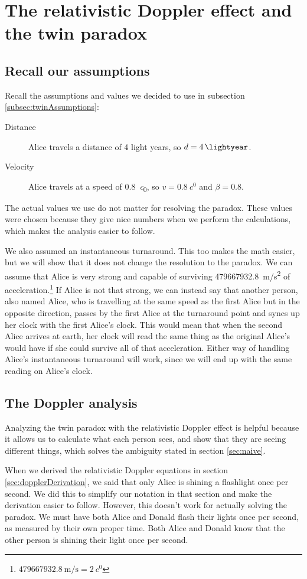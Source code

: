 \section{The relativistic Doppler effect and the twin paradox}\label{sec:dopplerAnalysis}
	\subsection{Recall our assumptions}
		Recall the assumptions and values we decided to use in subsection \ref{subsec:twinAssumptions}:
		\begin{description}
			\item[Distance] Alice travels a distance of 4 light years, so $d = \SI{4}{\lightyear}$.
			\item[Velocity] Alice travels at a speed of \SI{0.8}{\clight}, so $v = \SI{0.8}{\clight}$ and $\beta = 0.8$.
		\end{description}
		The actual values we use do not matter for resolving the paradox.
		These values were chosen because they give nice numbers when we perform the calculations, which makes the analysis easier to follow.

		We also assumed an instantaneous turnaround.
		This too makes the math easier, but we will show that it does not change the resolution to the paradox.
		We can assume that Alice is very strong and capable of surviving \SI{479667932.8}{\metre/\second^2} of acceleration.\footnote{$\SI{479667932.8}{\metre/\second} = \SI{2}{\clight}$}
		If Alice is not that strong, we can instead say that another person, also named Alice, who is travelling at the same speed as the first Alice but in the opposite direction, passes by the first Alice at the turnaround point and syncs up her clock with the first Alice's clock.
		This would mean that when the second Alice arrives at earth, her clock will read the same thing as the original Alice's would have if she could survive all of that acceleration.
		Either way of handling Alice's instantaneous turnaround will work, since we will end up with the same reading on Alice's clock.
	\subsection{The Doppler analysis}
		Analyzing the twin paradox with the relativistic Doppler effect is helpful because it allows us to calculate what each person sees, and show that they are seeing different things, which solves the ambiguity stated in section \ref{sec:naive}.

		When we derived the relativistic Doppler equations in section \ref{sec:dopplerDerivation}, we said that only Alice is shining a flashlight once per second.
		We did this to simplify our notation in that section and make the derivation easier to follow.
		However, this doesn't work for actually solving the paradox.
		We must have both Alice and Donald flash their lights once per second, as measured by their own proper time.
		Both Alice and Donald know that the other person is shining their light once per second.

